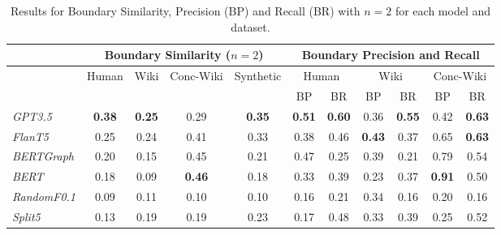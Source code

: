 \begin{table*}[t]
    \centering
    \begin{tabular}{@{}lcccc@{\hspace{2em}}ccccc@{\hspace{0.2em}}c@{}}
    \toprule
    & \multicolumn{4}{c}{Boundary Similarity ($n=2$)} & \multicolumn{6}{c}{Boundary Precision and Recall} \\ 
    \midrule
    & Human & Wiki & Conc-Wiki & Synthetic & \multicolumn{2}{c}{Human} & \multicolumn{2}{c}{Wiki} & \multicolumn{2}{c}{Conc-Wiki} \\ 
    &  &  &  &  & BP & BR & BP & BR & BP & BR \\
    \midrule
    \it GPT3.5  & \bf 0.38 & \bf 0.25 & 0.29 & \bf 0.35 & \bf 0.51 & \bf 0.60 & 0.36 & \bf 0.55 & 0.42 & \bf 0.63 \\ 
    \it FlanT5  & 0.25 & 0.24 & 0.41 & 0.33 & 0.38 & 0.46 & \bf 0.43 & 0.37 & 0.65 & \bf 0.63 \\ 
    \midrule
    \it BERTGraph   & 0.20 & 0.15 & 0.45 & 0.21 & 0.47 & 0.25 & 0.39 & 0.21 & 0.79 & 0.54 \\ 
    \it BERT    & 0.18 & 0.09 & \bf 0.46 & 0.18 & 0.33 & 0.39 & 0.23 & 0.37 & \bf 0.91 & 0.50 \\ 
    \it RandomF0.1 & 0.09 & 0.11 & 0.10 & 0.10 & 0.16 & 0.21 & 0.34 & 0.16 & 0.20 & 0.16 \\ 
    \it Split5  & 0.13 & 0.19 & 0.19 & 0.23 & 0.17 & 0.48 & 0.33 & 0.39 & 0.25 & 0.52 \\ 
    \bottomrule
    \end{tabular}
    \caption{Results for Boundary Similarity, Precision (BP) and Recall (BR) with $n=2$ for each model and dataset.}~\label{tab:combined_results}
    \vspace{-2em}
\end{table*}

